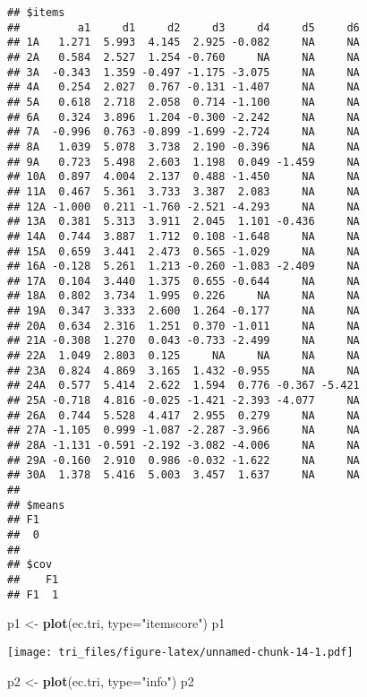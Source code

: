 \documentclass[]{article}
\newenvironment{Shaded}{\begin{snugshade}}{\end{snugshade}}
\newcommand{\KeywordTok}[1]{\textcolor[rgb]{0.13,0.29,0.53}{\textbf{#1}}}
\newcommand{\DataTypeTok}[1]{\textcolor[rgb]{0.13,0.29,0.53}{#1}}
\newcommand{\StringTok}[1]{\textcolor[rgb]{0.31,0.60,0.02}{#1}}
\newcommand{\NormalTok}[1]{#1}
\begin{document}
\begin{verbatim}
## $items
##         a1     d1     d2     d3     d4     d5     d6
## 1A   1.271  5.993  4.145  2.925 -0.082     NA     NA
## 2A   0.584  2.527  1.254 -0.760     NA     NA     NA
## 3A  -0.343  1.359 -0.497 -1.175 -3.075     NA     NA
## 4A   0.254  2.027  0.767 -0.131 -1.407     NA     NA
## 5A   0.618  2.718  2.058  0.714 -1.100     NA     NA
## 6A   0.324  3.896  1.204 -0.300 -2.242     NA     NA
## 7A  -0.996  0.763 -0.899 -1.699 -2.724     NA     NA
## 8A   1.039  5.078  3.738  2.190 -0.396     NA     NA
## 9A   0.723  5.498  2.603  1.198  0.049 -1.459     NA
## 10A  0.897  4.004  2.137  0.488 -1.450     NA     NA
## 11A  0.467  5.361  3.733  3.387  2.083     NA     NA
## 12A -1.000  0.211 -1.760 -2.521 -4.293     NA     NA
## 13A  0.381  5.313  3.911  2.045  1.101 -0.436     NA
## 14A  0.744  3.887  1.712  0.108 -1.648     NA     NA
## 15A  0.659  3.441  2.473  0.565 -1.029     NA     NA
## 16A -0.128  5.261  1.213 -0.260 -1.083 -2.409     NA
## 17A  0.104  3.440  1.375  0.655 -0.644     NA     NA
## 18A  0.802  3.734  1.995  0.226     NA     NA     NA
## 19A  0.347  3.333  2.600  1.264 -0.177     NA     NA
## 20A  0.634  2.316  1.251  0.370 -1.011     NA     NA
## 21A -0.308  1.270  0.043 -0.733 -2.499     NA     NA
## 22A  1.049  2.803  0.125     NA     NA     NA     NA
## 23A  0.824  4.869  3.165  1.432 -0.955     NA     NA
## 24A  0.577  5.414  2.622  1.594  0.776 -0.367 -5.421
## 25A -0.718  4.816 -0.025 -1.421 -2.393 -4.077     NA
## 26A  0.744  5.528  4.417  2.955  0.279     NA     NA
## 27A -1.105  0.999 -1.087 -2.287 -3.966     NA     NA
## 28A -1.131 -0.591 -2.192 -3.082 -4.006     NA     NA
## 29A -0.160  2.910  0.986 -0.032 -1.622     NA     NA
## 30A  1.378  5.416  5.003  3.457  1.637     NA     NA
## 
## $means
## F1 
##  0 
## 
## $cov
##    F1
## F1  1
\end{verbatim}

\begin{Shaded}
\begin{Highlighting}[]
\NormalTok{p1 <-}\StringTok{ }\KeywordTok{plot}\NormalTok{(ec.tri, }\DataTypeTok{type=}\StringTok{"itemscore"}\NormalTok{)}
\NormalTok{p1}
\end{Highlighting}
\end{Shaded}

\texttt{[image: tri\_files/figure-latex/unnamed-chunk-14-1.pdf]}

\begin{Shaded}
\begin{Highlighting}[]
\NormalTok{p2 <-}\StringTok{ }\KeywordTok{plot}\NormalTok{(ec.tri, }\DataTypeTok{type=}\StringTok{"info"}\NormalTok{)}
\NormalTok{p2}
\end{Highlighting}
\end{Shaded}
\end{document}
